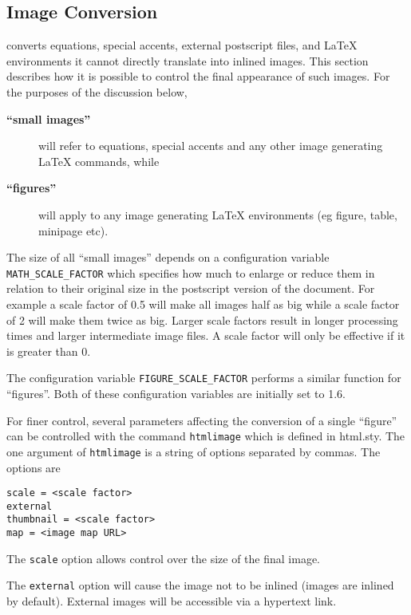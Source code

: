 \subsection{Image Conversion}
\label{imgcon}

\latextohtml converts equations, special accents, external postscript
files, and LaTeX environments it cannot directly translate into 
inlined images. This section describes how it is possible to control
the final appearance of such images. For the purposes of the discussion below,

\begin{description}
\item[{\bf ``small images''}] will refer to equations, special accents and
any other image generating LaTeX commands, while 
\item[{\bf ``figures''}] will
apply  to any image generating LaTeX environments (eg figure, table,
minipage etc).
\end{description}

The size of all ``small images'' depends on a configuration variable
{\tt MATH\_SCALE\_FACTOR} which specifies how much to enlarge or 
reduce them in relation to their original size in the postscript 
version of the document. For example a scale factor of 0.5 will make all 
images half as big while a scale factor of 2 will make them twice as
big.
Larger scale factors result in longer processing times and larger 
intermediate image files. A scale factor will only be effective 
if it is greater than 0. 

The configuration variable {\tt FIGURE\_SCALE\_FACTOR} performs
a similar function for ``figures''. Both of these configuration 
variables are initially set to 1.6.

For finer control, several
parameters affecting the conversion of a single ``figure'' 
can be controlled
with the command {\tt htmlimage} which is defined in {\fn
html.sty}.
The one argument of {\tt htmlimage}
is a string of options separated by commas. The options are
\begin{verbatim}
scale = <scale factor>
external
thumbnail = <scale factor>
map = <image map URL>
\end{verbatim}

The {\tt scale} option allows control over the size of the final
image.

The {\tt external} option will cause the image not to be inlined 
(images are inlined by default). External images will be accessible
via a hypertext link. 

